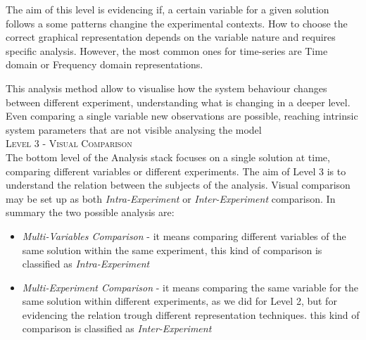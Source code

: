 The aim of this level is evidencing if, a certain variable for a given solution follows a some patterns changine the experimental contexts. How to choose the correct graphical representation depends on the variable nature and requires specific analysis. However, the most common ones for time-series are  Time domain or Frequency domain representations.

This analysis method allow to visualise how the system behaviour changes between different experiment, understanding what is changing in a deeper level.
Even comparing a single variable new observations are possible, reaching intrinsic system parameters that are not visible analysing the model\\
\textsc{Level 3 - Visual Comparison}\\

The bottom level of the Analysis stack focuses on a single solution at time, comparing different variables or different experiments. The aim of Level 3 is to understand the relation between the subjects of the analysis. Visual comparison may be set up as both \textit{Intra-Experiment} or \textit{Inter-Experiment} comparison. In summary the two possible analysis are:
\begin{itemize}
\item \textit{Multi-Variables Comparison} -  it means comparing different variables of the same solution within the same experiment, this kind of comparison is classified as \textit{Intra-Experiment}
\item \textit{Multi-Experiment Comparison} -  it means comparing the same variable for the same solution within different experiments, as we did for Level 2, but for evidencing the relation trough different representation techniques. this kind of comparison is classified as \textit{Inter-Experiment}
\end{itemize}






